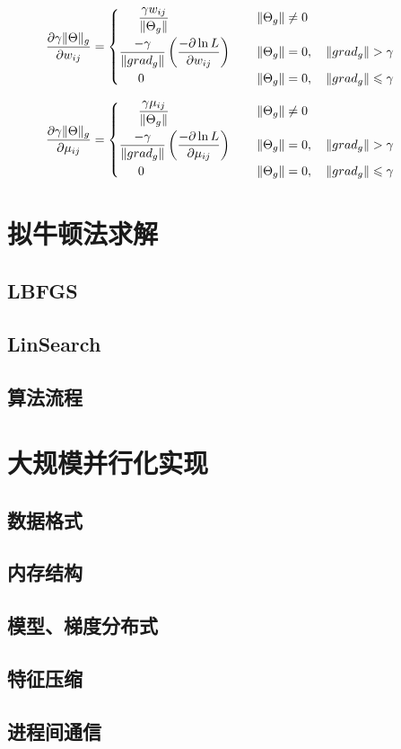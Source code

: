\documentclass[UTF8,10pt, twoside]{article}
\begin{document}
\begin{equation} 
\frac{\partial \gamma\|\Theta\|_g}{\partial w_{ij}} = 
\begin{cases}
\begin{aligned} 
						\frac{\gamma w_{ij}}{\|\Theta_g\|} \qquad\qquad\qquad\quad   \|\Theta_g\| &\ne 0  \cr 
						\frac{-\gamma}{\|grad_g\|}\left(\frac{-\partial \ln L}{\partial w_{ij}}\right) \qquad  \|\Theta_g\| &= 0,\quad\|grad_g\|>\gamma\cr  
						0 \qquad\qquad\qquad\qquad\quad  \|\Theta_g\| &= 0,\quad\|grad_g\|\leqslant\gamma\cr 
\end{aligned}
\end{cases}
\end{equation}
				
\begin{equation} 
\frac{\partial \gamma\|\Theta\|_g}{\partial \mu_{ij}} = 
\begin{cases}
\begin{aligned} 
							\frac{\gamma \mu_{ij}}{\|\Theta_g\|} \qquad\qquad\qquad\quad   \|\Theta_g\| &\ne 0  \cr 
							\frac{-\gamma}{\|grad_g\|}\left(\frac{-\partial \ln L}{\partial \mu_{ij}}\right) \qquad  \|\Theta_g\| &= 0,\quad\|grad_g\|>\gamma\cr  
							0 \qquad\qquad\qquad\qquad\quad  \|\Theta_g\| &= 0,\quad\|grad_g\|\leqslant\gamma\cr 
\end{aligned}
\end{cases}
\end{equation} 


\section{拟牛顿法求解}
\subsection{LBFGS}
\subsection{LinSearch}
\subsection{算法流程}

\section{大规模并行化实现}
\subsection{数据格式}
\subsection{内存结构}
\subsection{模型、梯度分布式}
\subsection{特征压缩}
\subsection{进程间通信}

 
\end{document}
